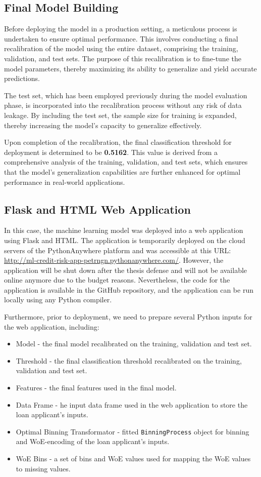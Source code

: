 \subsection{Final Model Building}
Before deploying the model in a production setting, a meticulous process is undertaken to ensure optimal performance.
This involves conducting a final recalibration of the model using the entire dataset, comprising the training, validation, and test sets.
The purpose of this recalibration is to fine-tune the model parameters, thereby maximizing its ability to generalize and yield accurate predictions.

The test set, which has been employed previously during the model evaluation phase, is incorporated into the recalibration process without any risk of data leakage.
By including the test set, the sample size for training is expanded, thereby increasing the model's capacity to generalize effectively.

Upon completion of the recalibration, the final classification threshold for deployment is determined to be \textbf{0.5162}.
This value is derived from a comprehensive analysis of the training, validation, and test sets, which ensures that the model's generalization capabilities are further enhanced for optimal performance in real-world applications.

\subsection{Flask and HTML Web Application}

In this case, the machine learning model was deployed into a web application using Flask and HTML. The application is temporarily deployed on the cloud servers of the PythonAnywhere platform and was accessible at this URL: \url{http://ml-credit-risk-app-petrngn.pythonanywhere.com/}.
However, the application will be shut down after the thesis defense and will not be available online anymore due to the budget reasons.
Nevertheless, the code for the application is available in the GitHub repository, and the application can be run locally using any Python compiler.

Furthermore, prior to deployment, we need to prepare several Python inputs for the web application, including:
\begin{itemize}\setlength\itemsep{0em}
    \item Model - the final model recalibrated on the training, validation and test set.
    \item Threshold - the final classification threshold recalibrated on the training, validation and test set.
    \item Features - the final features used in the final model.
    \item Data Frame - he input data frame used in the web application to store the loan applicant's inputs.
    \item Optimal Binning Transformator - fitted \lstinline{BinningProcess} object for binning and WoE-encoding of the loan applicant's inputs.
    \item WoE Bins - a set of bins and WoE values used for mapping the WoE values to missing values.
\end{itemize}

